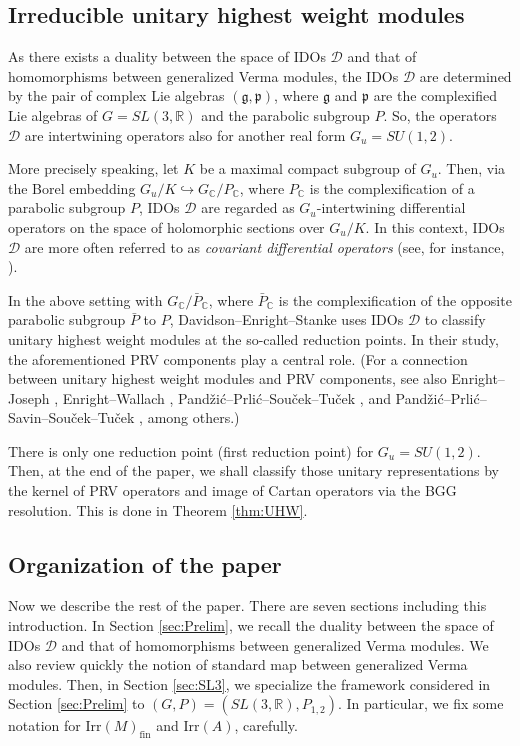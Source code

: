 \documentclass[reqno,11pt]{amsart}
\theoremstyle{remark}
\numberwithin{equation}{section}
\newcommand{\fg}{{\mathfrak g}}
\newcommand{\fp}{{\mathfrak p}}
\newcommand{\R}{\mathbb{R}}
\newcommand{\C}{\mathbb{C}}
\newcommand{\Cal}{\mathcal}
\newcommand{\Irr}{\mathrm{Irr}}
\newcommand{\fin}{\mathrm{fin}}
\newcommand{\D}{\Cal{D}}
\begin{document}
\subsection{Irreducible unitary highest weight modules}
As there exists a duality between the space of IDOs $\D$ and that of
homomorphisms between
generalized Verma modules, the IDOs $\D$ are determined by the pair of 
complex Lie algebras $(\fg, \fp)$, where $\fg$ and $\fp$ are the complexified
Lie algebras of $G=SL(3,\R)$ and 
the parabolic subgroup $P$. So, the operators $\D$ 
are intertwining operators also for another real form $G_u=SU(1,2)$.

More precisely speaking,
let $K$ be a maximal compact subgroup of $G_u$. Then, via the Borel embedding
$G_u/K \hookrightarrow G_\C/P_\C$, where $P_\C$ is the complexification
of a parabolic subgroup $P$, 
IDOs $\D$ are regarded as $G_u$-intertwining differential operators on
the space of holomorphic sections over $G_u/K$. In this context, 
IDOs $\D$ are more often referred to as \emph{covariant differential operators}
(see, for instance, \cite{HJ82, HJ83, Jakobsen85}).

In the above setting with $G_\C/\bar{P}_\C$, where $\bar{P}_\C$ is the 
complexification of the opposite parabolic subgroup $\bar{P}$ to $P$,
Davidson--Enright--Stanke \cite{DES90, DES91} uses 
IDOs $\D$ to classify unitary highest weight modules at the so-called reduction points.
In their study, the aforementioned PRV components play a central role. 
(For a connection between unitary highest 
weight modules and PRV components, see also Enright--Joseph \cite{EJ90},
Enright--Wallach \cite{EW97},
Pand{\v z}i{\' c}--Prli{\' c}--Sou{\v c}ek--Tu{\v c}ek \cite{PPST23+},
and Pand{\v z}i{\' c}--Prli{\' c}--Savin--Sou{\v c}ek--Tu{\v c}ek \cite{PPSST24+},
among others.)

There is only one reduction point (first reduction point) for $G_u=SU(1,2)$.
Then, at the end of the paper, we shall classify those unitary representations
by the kernel of PRV operators and image of Cartan operators
via the BGG resolution. This is done in Theorem \ref{thm:UHW}.

\subsection{Organization of the paper}
Now we describe the rest of the paper. There are seven sections including this 
introduction. In Section \ref{sec:Prelim}, we recall the duality between
the space of IDOs $\D$ and that of homomorphisms between
generalized Verma modules. We also 
review quickly the notion of standard map between generalized Verma modules.
Then, in Section \ref{sec:SL3}, we specialize the framework considered 
in Section \ref{sec:Prelim} to $(G,P)= (SL(3,\R), P_{1,2})$. In particular, we 
fix some notation for $\Irr(M)_{\fin}$ and $\Irr(A)$, carefully.
\end{document}

